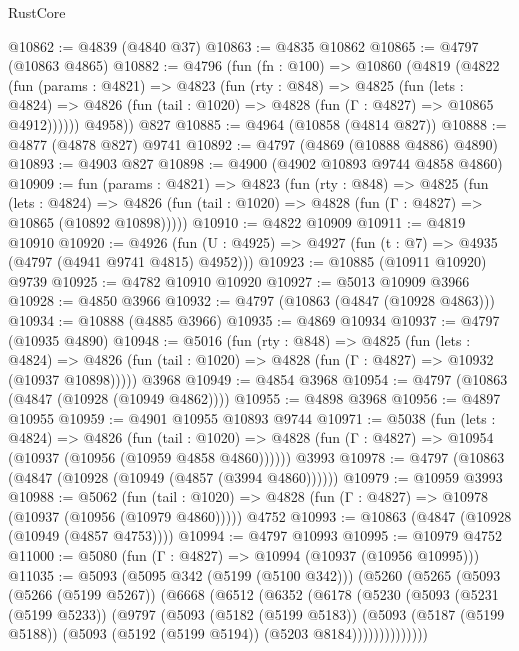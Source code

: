 \begin{lexlean}{RustCore}
\begin{coremodule}
@10862 := @4839 (@4840 @37)
@10863 := @4835 @10862
@10865 := @4797 (@10863 @4865)
@10882 := @4796
    (fun (fn : @100) =>
    @10860
      (@4819
        (@4822
          (fun (params : @4821) =>
          @4823
            (fun (rty : @848) =>
            @4825
              (fun (lets : @4824) =>
              @4826 (fun (tail : @1020) => @4828 (fun (Γ : @4827) => @10865 @4912))))))
        @4958))
    @827
@10885 := @4964 (@10858 (@4814 @827))
@10888 := @4877 (@4878 @827) @9741
@10892 := @4797 (@4869 (@10888 @4886) @4890)
@10893 := @4903 @827
@10898 := @4900 (@4902 @10893 @9744 @4858 @4860)
@10909 := fun (params : @4821) =>
  @4823
    (fun (rty : @848) =>
    @4825
      (fun (lets : @4824) =>
      @4826 (fun (tail : @1020) => @4828 (fun (Γ : @4827) => @10865 (@10892 @10898)))))
@10910 := @4822 @10909
@10911 := @4819 @10910
@10920 := @4926 (fun (U : @4925) => @4927 (fun (t : @7) => @4935 (@4797 (@4941 @9741 @4815) @4952)))
@10923 := @10885 (@10911 @10920) @9739
@10925 := @4782 @10910 @10920
@10927 := @5013 @10909 @3966
@10928 := @4850 @3966
@10932 := @4797 (@10863 (@4847 (@10928 @4863)))
@10934 := @10888 (@4885 @3966)
@10935 := @4869 @10934
@10937 := @4797 (@10935 @4890)
@10948 := @5016
    (fun (rty : @848) =>
    @4825
      (fun (lets : @4824) =>
      @4826 (fun (tail : @1020) => @4828 (fun (Γ : @4827) => @10932 (@10937 @10898)))))
    @3968
@10949 := @4854 @3968
@10954 := @4797 (@10863 (@4847 (@10928 (@10949 @4862))))
@10955 := @4898 @3968
@10956 := @4897 @10955
@10959 := @4901 @10955 @10893 @9744
@10971 := @5038
    (fun (lets : @4824) =>
    @4826
      (fun (tail : @1020) =>
      @4828 (fun (Γ : @4827) => @10954 (@10937 (@10956 (@10959 @4858 @4860))))))
    @3993
@10978 := @4797 (@10863 (@4847 (@10928 (@10949 (@4857 (@3994 @4860))))))
@10979 := @10959 @3993
@10988 := @5062
    (fun (tail : @1020) => @4828 (fun (Γ : @4827) => @10978 (@10937 (@10956 (@10979 @4860)))))
    @4752
@10993 := @10863 (@4847 (@10928 (@10949 (@4857 @4753))))
@10994 := @4797 @10993
@10995 := @10979 @4752
@11000 := @5080 (fun (Γ : @4827) => @10994 (@10937 (@10956 @10995)))
@11035 := @5093
    (@5095 @342 (@5199 (@5100 @342)))
    (@5260
      (@5265
        (@5093
          (@5266 (@5199 @5267))
          (@6668
            (@6512
              (@6352
                (@6178
                  (@5230
                    (@5093
                      (@5231 (@5199 @5233))
                      (@9797
                        (@5093
                          (@5182 (@5199 @5183))
                          (@5093
                            (@5187 (@5199 @5188))
                            (@5093 (@5192 (@5199 @5194)) (@5203 @8184))))))))))))))

\end{coremodule}
\end{lexlean}
